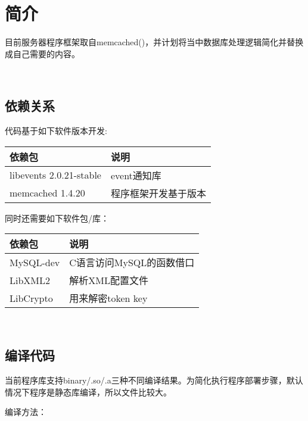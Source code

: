 \documentclass[a4paper]{article}
\title{\xkai{服务器并发处理框架文档}}
\author{CareDear Service Team}
\newcommand{\kai}[1]{{\KAI#1}}
\begin{document}
\maketitle

\tableofcontents

\begin{abstract}
\kai{本文档介绍一种处理并发的服务器后台运行程序框架，暂叫成\colorbox{mygreen}{CDS(CareDear Service)}}
\end{abstract}

\section{简介}
目前服务器程序框架取自memcached(\cite{refMemcach})，并计划将当中数据库处理逻辑简化并替换成自己需要的内容。

　　\subsection{依赖关系}
代码基于如下软件版本开发:

\bgroup
\def\arraystretch{1.15}
\begin{tabular}{|l|l|}
\hline
{依赖包} & {说明}\\
\hline
{libevents 2.0.21-stable} & {event通知库}\\
{memcached 1.4.20} & {程序框架开发基于版本}\\
\hline
\end{tabular}
\egroup

同时还需要如下软件包/库：
\bgroup
\def\arraystretch{1.15}
\begin{tabular}{|l|l|}
\hline
{依赖包} & {说明}\\
\hline
{MySQL-dev} & {C语言访问MySQL的函数借口}\\
{LibXML2} & {解析XML配置文件}\\
{LibCrypto} & {用来解密token key}\\
\hline
\end{tabular}
\egroup

　　\subsection{编译代码}
当前程序库支持binary/.so/.a三种不同编译结果。为简化执行程序部署步骤，默认情况下程序是静态库编译，所以文件比较大。

编译方法：

\end{document}
